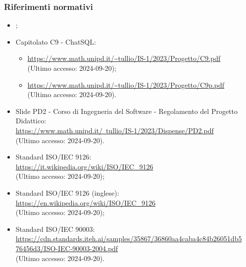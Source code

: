 \subsubsection{Riferimenti normativi}
\begin{itemize}
  \item \NormeDiProgetto;
  \item Capitolato C9 - ChatSQL:
  \begin{itemize}
    \item \href{https://www.math.unipd.it/~tullio/IS-1/2023/Progetto/C9.pdf}{https://www.math.unipd.it/\textasciitilde tullio/IS-1/2023/Progetto/C9.pdf} \\ (Ultimo accesso: 2024-09-20);
    \item \href{https://www.math.unipd.it/~tullio/IS-1/2023/Progetto/C9p.pdf}{https://www.math.unipd.it/\textasciitilde tullio/IS-1/2023/Progetto/C9p.pdf} \\ (Ultimo accesso: 2024-09-20).
  \end{itemize}
  \item Slide PD2 - Corso di Ingegneria del Software - Regolamento del Progetto Didattico: \\ \href{https://www.math.unipd.it/~tullio/IS-1/2023/Dispense/PD2.pdf}{https://www.math.unipd.it/~tullio/IS-1/2023/Dispense/PD2.pdf} \\ (Ultimo accesso: 2024-09-20).
  \item Standard ISO/IEC 9126: \\ \href{https://it.wikipedia.org/wiki/ISO/IEC_9126}{https://it.wikipedia.org/wiki/ISO/IEC\_9126}  \\ (Ultimo accesso: 2024-09-20);
  \item Standard ISO/IEC 9126 (inglese): \\ \href{https://en.wikipedia.org/wiki/ISO/IEC_9126}{https://en.wikipedia.org/wiki/ISO/IEC\_9126}  \\ (Ultimo accesso: 2024-09-20);
  \item Standard ISO/IEC 90003: \\ \href{https://cdn.standards.iteh.ai/samples/35867/36860aa4caba4c84b26051db576456d3/ISO-IEC-90003-2004.pdf}{https://cdn.standards.iteh.ai/samples/35867/36860aa4caba4c84b26051db5 \- 76456d3/ISO-IEC-90003-2004.pdf}  \\ (Ultimo accesso: 2024-09-20).
\end{itemize}

